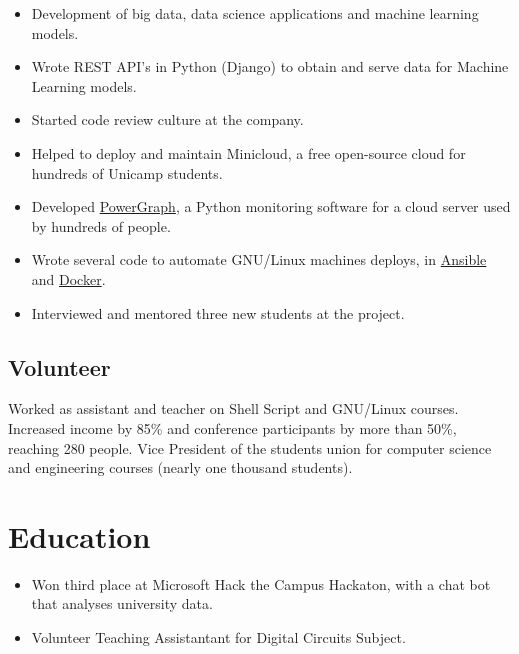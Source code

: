 \documentclass[10pt, a4paper, roman]{moderncv} %
\begin{document}
{
    \begin{itemize}
        \item Development of big data, data science applications and machine learning models.
        \item Wrote REST API's in Python (Django) to obtain and serve data for Machine Learning models. 
        \item Started code review culture at the company.
    \end{itemize}
}
{
    \begin{itemize}
        \item Helped to deploy and maintain Minicloud, a free open-source cloud for hundreds of Unicamp students.
        \item Developed \href{https://github.com/Guilhermeslucas/powergraph}{PowerGraph}, a Python monitoring software for a cloud server used by hundreds of people.
        \item Wrote several code to automate GNU/Linux machines deploys, in \href{https://github.com/Guilhermeslucas/Ansible-Code}{Ansible} and 
            \href{https://github.com/Guilhermeslucas/Dockerfiles}{Docker}.
        \item Interviewed and mentored three new students at the project.
    \end{itemize}
}
\subsection{Volunteer}
{
    Worked as assistant and teacher on Shell Script and GNU/Linux courses.
}
{
    Increased income by 85\% and conference participants by more than 50\%, reaching 280 people.
}
{
    Vice President of the students union for computer science and engineering courses (nearly one thousand students).
}
\section{Education}

{
    \begin{itemize}
        \item Won third place at Microsoft Hack the Campus Hackaton, with a chat bot that analyses university data.
        \item Volunteer Teaching Assistantant for Digital Circuits Subject.
    \end{itemize} 
}
\end{document}
